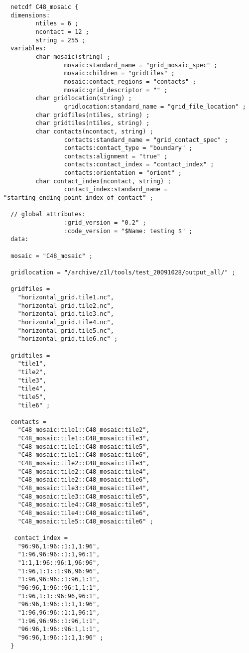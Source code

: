   \begin{verbatim}
  netcdf C48_mosaic {
  dimensions:
         ntiles = 6 ;
         ncontact = 12 ;
         string = 255 ;
  variables:
         char mosaic(string) ;
                 mosaic:standard_name = "grid_mosaic_spec" ;
                 mosaic:children = "gridtiles" ;
                 mosaic:contact_regions = "contacts" ;
                 mosaic:grid_descriptor = "" ;
         char gridlocation(string) ;
                 gridlocation:standard_name = "grid_file_location" ;
         char gridfiles(ntiles, string) ;
         char gridtiles(ntiles, string) ;
         char contacts(ncontact, string) ;
                 contacts:standard_name = "grid_contact_spec" ;
                 contacts:contact_type = "boundary" ;
                 contacts:alignment = "true" ;
                 contacts:contact_index = "contact_index" ;
                 contacts:orientation = "orient" ;
         char contact_index(ncontact, string) ;
                 contact_index:standard_name = "starting_ending_point_index_of_contact" ;
 
  // global attributes:
                 :grid_version = "0.2" ;
                 :code_version = "$Name: testing $" ;
  data:
  
  mosaic = "C48_mosaic" ;
  
  gridlocation = "/archive/z1l/tools/test_20091028/output_all/" ;
  
  gridfiles =
    "horizontal_grid.tile1.nc",
    "horizontal_grid.tile2.nc",
    "horizontal_grid.tile3.nc",
    "horizontal_grid.tile4.nc",
    "horizontal_grid.tile5.nc",
    "horizontal_grid.tile6.nc" ;
  
  gridtiles =
    "tile1",
    "tile2",
    "tile3",
    "tile4",
    "tile5",
    "tile6" ;
  
  contacts =
    "C48_mosaic:tile1::C48_mosaic:tile2",
    "C48_mosaic:tile1::C48_mosaic:tile3",
    "C48_mosaic:tile1::C48_mosaic:tile5",
    "C48_mosaic:tile1::C48_mosaic:tile6",
    "C48_mosaic:tile2::C48_mosaic:tile3",
    "C48_mosaic:tile2::C48_mosaic:tile4",
    "C48_mosaic:tile2::C48_mosaic:tile6",
    "C48_mosaic:tile3::C48_mosaic:tile4",
    "C48_mosaic:tile3::C48_mosaic:tile5",
    "C48_mosaic:tile4::C48_mosaic:tile5",
    "C48_mosaic:tile4::C48_mosaic:tile6",
    "C48_mosaic:tile5::C48_mosaic:tile6" ;
  
   contact_index =
    "96:96,1:96::1:1,1:96",
    "1:96,96:96::1:1,96:1",
    "1:1,1:96::96:1,96:96",
    "1:96,1:1::1:96,96:96",
    "1:96,96:96::1:96,1:1",
    "96:96,1:96::96:1,1:1",
    "1:96,1:1::96:96,96:1",
    "96:96,1:96::1:1,1:96",
    "1:96,96:96::1:1,96:1",
    "1:96,96:96::1:96,1:1",
    "96:96,1:96::96:1,1:1",
    "96:96,1:96::1:1,1:96" ;
  }
  \end{verbatim}
  
